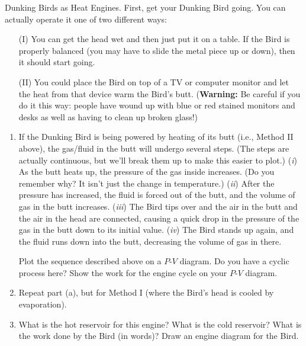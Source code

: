 \begin{aproblem}{Dunking Birds as Heat Engines.} 
  First, get your Dunking Bird going.  You can actually operate it one
  of two different ways:
  \begin{itemize}
  \item[(I)] You can get the head wet and then just put it on a table.
    If the Bird is properly balanced (you may have to slide the metal
    piece up or down), then it should start going.

  \item[(II)] You could place the Bird on top of a TV or computer
    monitor and let the heat from that device warm the Bird's butt.
    ({\bf Warning:} Be careful if you do it this way: people have
    wound up with blue or red stained monitors and desks as well as
    having to clean up broken glass!)
  \end{itemize}


  \begin{enumerate}
  \item If the Dunking Bird is being powered by heating of its butt
    (i.e., Method II above), the gas/fluid in the butt will undergo
    several steps.  (The steps are actually continuous, but we'll
    break them up to make this easier to plot.)  ({\it i}) As the butt heats
    up, the pressure of the gas inside increases.  (Do you remember
    why?  It isn't just the change in temperature.) ({\it ii}) After the
    pressure has increased, the fluid is forced out of the butt, and
    the volume of gas in the butt increases.  ({\it iii}) The Bird tips over
    and the air in the butt and the air in the head are connected,
    causing a quick drop in the pressure of the gas in the butt down
    to its initial value.  ({\it iv}) The Bird stands up again, and the
    fluid runs down into the butt, decreasing the volume of gas in
    there.

    Plot the sequence described above on a $P$-$V$ diagram.  Do you
    have a cyclic process here?  Show the work for the engine cycle on
    your $P$-$V$ diagram.

  \item Repeat part (a), but for Method I (where the Bird's head is
    cooled by evaporation).

  \item What is the hot reservoir for this engine?  What is the cold
    reservoir?  What is the work done by the Bird (in words)?  Draw an
    engine diagram for the Bird.
 
  \end{enumerate}
\end{aproblem}


